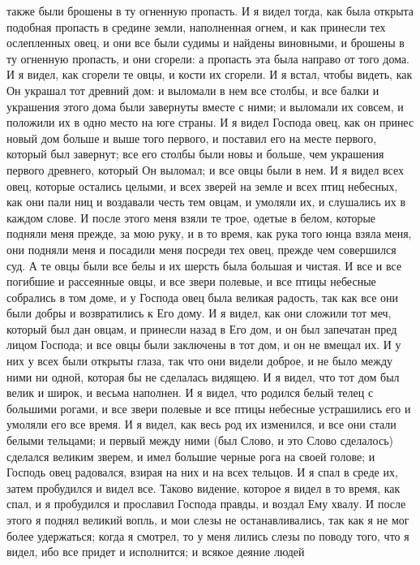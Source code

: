 также были брошены в ту огненную пропасть.
И я видел тогда, как была открыта подобная пропасть в средине земли,
наполненная огнем, и как принесли тех ослепленных овец, и они все были судимы и
найдены виновными, и брошены в ту огненную пропасть, и они сгорели: а пропасть
эта была направо от того дома.
И я видел, как сгорели те овцы, и кости их сгорели.
И я встал, чтобы видеть, как Он украшал тот древний дом: и выломали в
нем все столбы, и все балки и украшения этого дома были завернуты вместе с
ними; и выломали их совсем, и положили их в одно место на юге страны.
И я видел Господа овец, как он принес новый дом больше и выше того
первого, и поставил его на месте первого, который был завернут; все его столбы
были новы и больше, чем украшения первого древнего, который Он выломал; и все
овцы были в нем.
И я видел всех овец, которые остались целыми, и всех зверей на земле
и всех птиц небесных, как они пали ниц и воздавали честь тем овцам, и умоляли
их, и слушались их в каждом слове.
И после этого меня взяли те трое, одетые в белом, которые подняли
меня прежде, за мою руку, и в то время, как рука того юнца взяла меня, они
подняли меня и посадили меня посреди тех овец, прежде чем совершился суд.
А те овцы были все белы и их шерсть была большая и чистая.
И все и все погибшие и рассеянные овцы, и все звери полевые, и все
птицы небесные собрались в том доме, и у Господа овец была великая радость, так
как все они были добры и возвратились к Его дому.
И я видел, как они сложили тот меч, который был дан овцам, и принесли
назад в Его дом, и он был запечатан пред лицом Господа; и все овцы были
заключены в тот дом, и он не вмещал их.
И у них у всех были открыты глаза, так что они видели доброе, и не
было между ними ни одной, которая бы не сделалась видящею.
И я видел, что тот дом был велик и широк, и весьма наполнен.
И я видел, что родился белый телец с большими рогами, и все звери
полевые и все птицы небесные устрашились его и умоляли его все время.
И я видел, как весь род их изменился, и все они стали белыми
тельцами; и первый между ними (был Слово, и это Слово сделалось) сделался
великим зверем, и имел большие черные рога на своей голове; и Господь овец
радовался, взирая на них и на всех тельцов.
И я спал в среде их, затем пробудился и видел все.
Таково видение, которое я видел в то время, как спал, и я пробудился
и прославил Господа правды, и воздал Ему хвалу.
И после этого я поднял великий вопль, и мои слезы не останавливались,
так как я не мог более удержаться; когда я смотрел, то у меня лились слезы по
поводу того, что я видел, ибо все придет и исполнится; и всякое деяние людей
